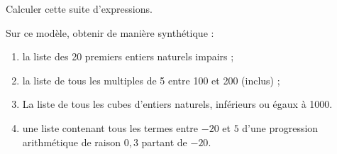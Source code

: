 Calculer cette suite d'expressions.
\begin{pyverbatim}
\end{pyverbatim}
Sur ce modèle, obtenir de manière synthétique : 
\begin{enumerate}[label=\emph{\alph*)}]
  \item la liste des 20 premiers entiers naturels impairs ;
  \item la liste de tous les multiples de 5 entre 100 et 200 (inclus) ;
  \item La liste de tous les cubes d'entiers naturels, inférieurs ou égaux à 1000. 
  \item une liste contenant tous les termes entre $-20$ et $5$ d'une progression arithmétique de raison $0,3$ partant de $-20$.
\end{enumerate}